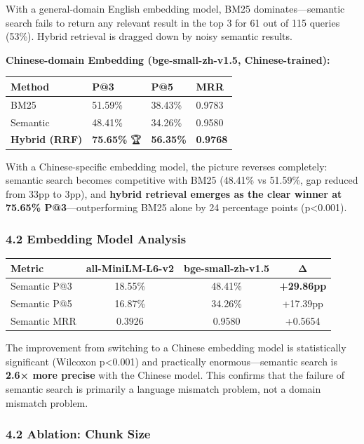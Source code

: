 \documentclass[
]{article}
\begin{document}
With a general-domain English embedding model, BM25 dominates---semantic
search fails to return any relevant result in the top 3 for 61 out of
115 queries (53\%). Hybrid retrieval is dragged down by noisy semantic
results.

\textbf{Chinese-domain Embedding (bge-small-zh-v1.5, Chinese-trained):}

\begin{longtable}[]{@{}llll@{}}
\toprule\noalign{}
Method & P@3 & P@5 & MRR \\
\midrule\noalign{}
\endhead
\bottomrule\noalign{}
\endlastfoot
BM25 & 51.59\% & 38.43\% & 0.9783 \\
Semantic & 48.41\% & 34.26\% & 0.9580 \\
\textbf{Hybrid (RRF)} & \textbf{75.65\%} 🏆 & \textbf{56.35\%} &
\textbf{0.9768} \\
\end{longtable}

With a Chinese-specific embedding model, the picture reverses
completely: semantic search becomes competitive with BM25 (48.41\% vs
51.59\%, gap reduced from 33pp to 3pp), and \textbf{hybrid retrieval
emerges as the clear winner at 75.65\% P@3}---outperforming BM25 alone
by 24 percentage points (p\textless0.001).

\subsubsection{4.2 Embedding Model
Analysis}\label{embedding-model-analysis}

\begin{longtable}[]{@{}lccc@{}}
\toprule\noalign{}
Metric & all-MiniLM-L6-v2 & bge-small-zh-v1.5 & Δ \\
\midrule\noalign{}
\endhead
\bottomrule\noalign{}
\endlastfoot
Semantic P@3 & 18.55\% & 48.41\% & \textbf{+29.86pp} \\
Semantic P@5 & 16.87\% & 34.26\% & +17.39pp \\
Semantic MRR & 0.3926 & 0.9580 & +0.5654 \\
\end{longtable}

The improvement from switching to a Chinese embedding model is
statistically significant (Wilcoxon p\textless0.001) and practically
enormous---semantic search is \textbf{2.6× more precise} with the
Chinese model. This confirms that the failure of semantic search is
primarily a language mismatch problem, not a domain mismatch problem.

\subsubsection{4.2 Ablation: Chunk Size}\label{ablation-chunk-size}
\end{document}
